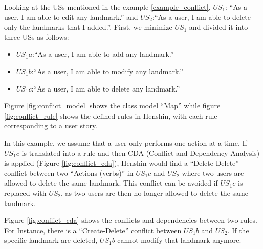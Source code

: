 \begin{example}
Looking at the USs mentioned in the example \ref{example_conflict}, $US_1$: \enquote{As a user, I am able to edit any landmark.} and $US_2$:\enquote{As a user, I am able to delete only the landmarks that I added.}. First, we minimize $US_1$ and divided it into three USs as follows:
\begin{itemize}
\item $US_1a$:\enquote{As a user, I am able to add any landmark.}
\item $US_1b$:\enquote{As a user, I am able to modify any landmark.}
\item $US_1c$:\enquote{As a user, I am able to delete any landmark.}
\end{itemize}
Figure \ref{fig:conflict_model} shows the class model \enquote{Map} while figure \ref{fig:conflict_rule} shows the defined rules in Henshin, with each rule corresponding to a user story.

In this example, we assume that a user only performs one action at a time.
If $US_1c$ is translated into a rule and then CDA (Conflict and Dependency Analysis) is applied (Figure \ref{fig:conflict_cda}), Henshin would find a \enquote{Delete-Delete} conflict between two \enquote{Actions (verbs)} in $US_1c$ and $US_2$ where two users are allowed to delete the same landmark. This conflict can be avoided if $US_1c$ is replaced with $US_2$, as two users are then no longer allowed to delete the same landmark.

Figure \ref{fig:conflict_cda} shows the conflicts and dependencies between two rules. For Instance, there is a \enquote{Create-Delete} conflict between $US_1b$ and $US_2$. If the specific landmark are deleted, $US_1b$ cannot modify that landmark anymore.


\end{example}
